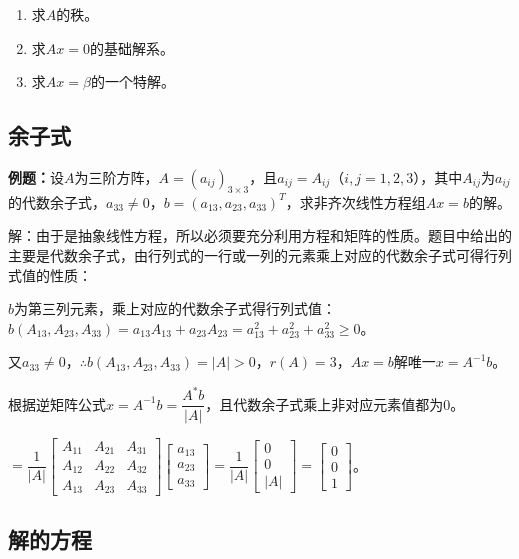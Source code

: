 \documentclass[UTF8, 12pt]{ctexart}
\begin{document}
\begin{enumerate}
    \item 求$A$的秩。
    \item 求$Ax=0$的基础解系。
    \item 求$Ax=\beta$的一个特解。
\end{enumerate}

\subsection{余子式}

\textbf{例题：}设$A$为三阶方阵，$A=(a_{ij})_{3\times3}$，且$a_{ij}=A_{ij}$（$i,j=1,2,3$），其中$A_{ij}$为$a_{ij}$的代数余子式，$a_{33}\neq0$，$b=(a_{13},a_{23},a_{33})^T$，求非齐次线性方程组$Ax=b$的解。

解：由于是抽象线性方程，所以必须要充分利用方程和矩阵的性质。题目中给出的主要是代数余子式，由行列式的一行或一列的元素乘上对应的代数余子式可得行列式值的性质：

$b$为第三列元素，乘上对应的代数余子式得行列式值：$b(A_{13},A_{23},A_{33})=a_{13}A_{13}+a_{23}A_{23}=a_{13}^2+a_{23}^2+a_{33}^2\geqslant0$。

又$a_{33}\neq0$，$\therefore b(A_{13},A_{23},A_{33})=\vert A\vert>0$，$r(A)=3$，$Ax=b$解唯一$x=A^{-1}b$。

根据逆矩阵公式$x=A^{-1}b=\dfrac{A^*b}{\vert A\vert}$，且代数余子式乘上非对应元素值都为0。

$=\dfrac{1}{\vert A\vert}\left[\begin{array}{ccc}
    A_{11} & A_{21} & A_{31} \\
    A_{12} & A_{22} & A_{32} \\
    A_{13} & A_{23} & A_{33} 
\end{array}\right]\left[\begin{array}{c}
    a_{13} \\
    a_{23} \\
    a_{33}
\end{array}\right]=\dfrac{1}{\vert A\vert}\left[\begin{array}{c}
    0 \\
    0 \\
    \vert A\vert
\end{array}\right]=\left[\begin{array}{c}
    0 \\
    0 \\
    1
\end{array}\right]$。

\subsection{解的方程}
\end{document}
